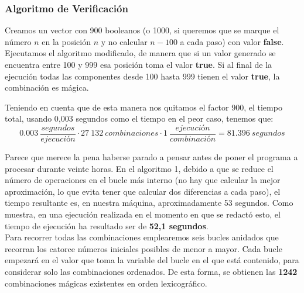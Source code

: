 \subsubsection{Algoritmo de Verificación}
Creamos un vector con 900 booleanos (o 1000, si queremos que se marque el número
$n$ en la posición $n$ y no calcular $n-100$ a cada paso) con valor \textbf{false}.
Ejecutamos el algoritmo modificado, de manera que si un valor generado se encuentra
entre 100 y 999 esa posición toma el valor \textbf{true}. Si al final de la
ejecución todas las componentes desde 100 hasta 999 tienen el valor \textbf{true},
la combinación es mágica. 

Teniendo en cuenta que de esta manera nos quitamos el factor 900, el tiempo total,
usando 0,003 segundos como el tiempo en el peor caso, tenemos que:
$$ 0.003\ \frac{segundos}{ejecución} \cdot 27\ 132\ combinaciones \cdot 1\  \frac{ejecución}{combinación}=81.396\ segundos$$

Parece que merece la pena haberse parado a pensar antes de poner el programa a
procesar durante veinte horas. En el algoritmo 1, debido a que se reduce el número
de operaciones en el bucle más interno (no hay que calcular la mejor aproximación,
lo que evita tener que calcular dos diferencias a cada paso), el tiempo resultante
es, en nuestra máquina, aproximadamente 53 segundos. Como muestra,
en una ejecución realizada en el momento en que se redactó esto, el tiempo de
ejecución ha resultado ser de \textbf{52,1 segundos}. \\

Para recorrer todas las combinaciones emplearemos seis bucles anidados que recorran
los catorce números iniciales posibles de menor a mayor. Cada bucle empezará en el
valor que toma la variable del bucle en el que está contenido, para considerar solo
las combinaciones ordenados. De esta forma, se obtienen las \textbf{1242}
combinaciones mágicas existentes en orden lexicográfico.